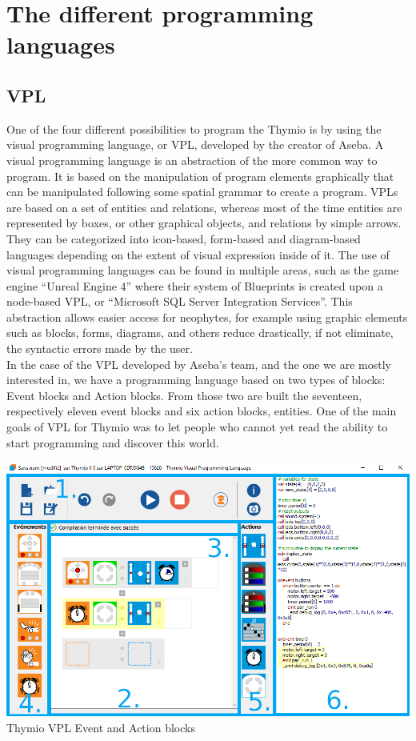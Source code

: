 \documentclass{scrbook}
\begin{document}
\appendix

\chapter{The different programming languages \label{fourlanguages}} 
\section{VPL}

One of the four different possibilities to program the Thymio is by using the visual programming language, or VPL, 
developed by the creator of Aseba. A visual programming language is an abstraction of the more common way to program. 
It is based on the manipulation of program elements graphically that can be manipulated following some spatial grammar to create a program. 
VPLs are based on a set of entities and relations, whereas most of the time entities are represented by boxes, 
or other graphical objects, and relations by simple arrows. They can be categorized into icon-based, 
form-based and diagram-based languages depending on the extent of visual expression inside of it. 
The use of visual programming languages can be found in multiple areas, such as the game engine “Unreal Engine 4” where their system of Blueprints is created upon a node-based VPL, 
or “Microsoft SQL Server Integration Services”. This abstraction allows easier access for neophytes, 
for example using graphic elements such as blocks, forms, diagrams, and others reduce drastically, if not eliminate, the syntactic errors made by the user.\\

In the case of the VPL developed by Aseba’s team, and the one we are mostly interested in, we have a programming language based on two types of blocks: Event blocks and Action blocks. 
From those two are built the seventeen, respectively eleven event blocks and six action blocks, entities. 
One of the main goals of VPL for Thymio was to let people who cannot yet read the ability to start programming and discover this world.\\

\begin{center}
  \includegraphics[width=\textwidth]{./VPL/Thymio_VPL_window}\\
  Thymio VPL Event and Action blocks
\end{center}
\end{document}
